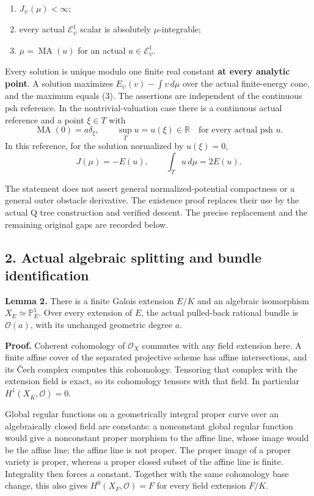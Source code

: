 \documentclass[
  11pt,
]{article}
\providecommand{\tightlist}{%
  \setlength{\itemsep}{0pt}\setlength{\parskip}{0pt}}
\begin{document}
\begin{enumerate}
\def\labelenumi{\arabic{enumi}.}
\tightlist
\item
  \(J_\psi(\mu)<\infty\);
\item
  every actual \(\mathcal E^1_\psi\) scalar is absolutely
  \(\mu\)-integrable;
\item
  \(\mu=\operatorname{MA}(u)\) for an actual \(u\in\mathcal E^1_\psi\).
\end{enumerate}

Every solution is unique modulo one finite real constant \textbf{at
every analytic point}. A solution maximizes \(E_\psi(v)-\int v\,d\mu\)
over the actual finite-energy cone, and the maximum equals (3). The
assertions are independent of the continuous psh reference. In the
nontrivial-valuation case there is a continuous actual reference and a
point \(\xi\in T\) with \[
\operatorname{MA}(0)=a\delta_\xi,\qquad
\sup_T u=u(\xi)\in\mathbb R\quad\text{for every actual psh }u.
\tag{4}
\] In this reference, for the solution normalized by \(u(\xi)=0\), \[
J(\mu)=-E(u),\qquad \int_Tu\,d\mu=2E(u).
\tag{5}
\]

The statement does not assert general normalized-potential compactness
or a general outer obstacle derivative. The existence proof replaces
their use by the actual Q tree construction and verified descent. The
precise replacement and the remaining original gaps are recorded below.

\subsection{2. Actual algebraic splitting and bundle
identification}\label{actual-algebraic-splitting-and-bundle-identification}

\textbf{Lemma 2.} There is a finite Galois extension \(E/K\) and an
algebraic isomorphism \(X_E\simeq\mathbb P^1_E\). Over every extension
of \(E\), the actual pulled-back rational bundle is \(\mathcal O(a)\),
with its unchanged geometric degree \(a\).

\textbf{Proof.} Coherent cohomology of \(\mathcal O_X\) commutes with
any field extension here. A finite affine cover of the separated
projective scheme has affine intersections, and its Čech complex
computes this cohomology. Tensoring that complex with the extension
field is exact, so its cohomology tensors with that field. In particular
\(H^1(X_{\overline K},\mathcal O)=0\).

Global regular functions on a geometrically integral proper curve over
an algebraically closed field are constants: a nonconstant global
regular function would give a nonconstant proper morphism to the affine
line, whose image would be the affine line; the affine line is not
proper. The proper image of a proper variety is proper, whereas a proper
closed subset of the affine line is finite. Integrality then forces a
constant. Together with the same cohomology base change, this also gives
\(H^0(X_F,\mathcal O)=F\) for every field extension \(F/K\).
\end{document}
